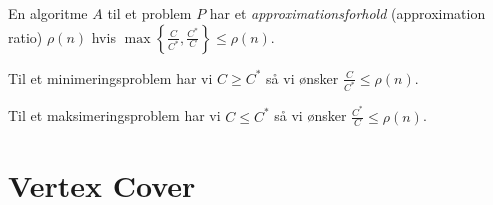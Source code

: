 En algoritme $A$ til et problem $P$ har et \textit{approximationsforhold} (approximation ratio) $\rho(n)$ hvis $\max \left\{ \frac{C}{C^{*}}, \frac{C^{*}}{C} \right\} \le \rho(n)$.

Til et minimeringsproblem har vi $C \ge C^{*}$ så vi ønsker $\frac{C}{C^{*}} \le \rho(n)$.

Til et maksimeringsproblem har vi $C \le C^{*}$ så vi ønsker $\frac{C^{*}}{C} \le \rho(n)$.

\section{Vertex Cover}%
\label{sec:label}

